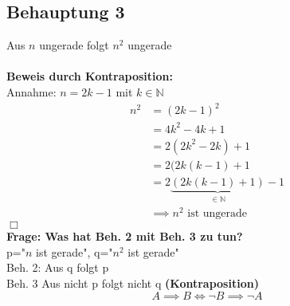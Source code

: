 \documentclass{article}
\begin{document}
        \subsection{Behauptung 3}
            Aus $n$ ungerade folgt $n^2$ ungerade\\\\
            \textbf{Beweis durch Kontraposition:}\\
                Annahme: $n=2k-1$ mit $k\in \mathbb{N}$
                \begin{align*}
                    n^2 &= (2k-1)^2 \\
                    \, &= 4k^2 - 4k + 1 \\
                    \, &= 2(2k^2 - 2k) + 1 \\
                    \, &= 2(2k(k-1) + 1 \\
                    \, &= 2\underbrace{(2k(k-1)+1)}_{\in \mathbb{N}} - 1 \\
                    &\implies n^2 \text{ ist ungerade}
                \end{align*}
		\hfill $\Box$\\
            \textbf{Frage: Was hat Beh. 2 mit Beh. 3 zu tun?}\\
            p="$n$ ist gerade", q="$n^2$ ist gerade"\\
            Beh. 2: Aus q folgt p\\
            Beh. 3 Aus nicht p folgt nicht q \textbf{(Kontraposition)}
            \textbf{$$A\implies B \Leftrightarrow \lnot B \implies \lnot A$$}
\end{document}
